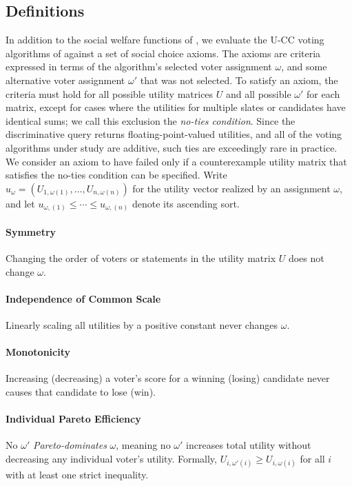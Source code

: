 \documentclass[letterpaper]{article} %
\begin{document}
\subsection{Definitions}
\label{app:axiom-definitions}

In addition to the social welfare functions of , we evaluate the \textsc{U-CC} voting algorithms of  against a set of social choice axioms.
The axioms are criteria expressed in terms of the algorithm's selected voter assignment $\omega$, and some alternative voter assignment $\omega'$ that was not selected.
To satisfy an axiom, the criteria must hold for all possible utility matrices $U$ and all possible $\omega'$ for each matrix, except for cases where the utilities for multiple slates or candidates have identical sums; we call this exclusion the \emph{no-ties condition}.
Since the discriminative query returns floating-point-valued utilities, and all of the voting algorithms under study are additive, such ties are exceedingly rare in practice.
We consider an axiom to have failed only if a counterexample utility matrix that satisfies the no-ties condition can be specified.
Write $u_\omega=(U_{1,\omega(1)},\ldots,U_{n,\omega(n)})$ for the utility vector realized by an assignment $\omega$, and let $u_{\omega,(1)}\le\cdots\le u_{\omega,(n)}$ denote its ascending sort.

\paragraph{Symmetry}
Changing the order of voters or statements in the utility matrix $U$ does not change $\omega$.

\paragraph{Independence of Common Scale}
Linearly scaling all utilities by a positive constant never changes $\omega$.

\paragraph{Monotonicity}
Increasing (decreasing) a voter's score for a winning (losing) candidate never causes that candidate to lose (win).

\paragraph{Individual Pareto Efficiency}
No $\omega'$ \emph{Pareto-dominates} $\omega$, meaning no $\omega'$ increases total utility without decreasing any individual voter's utility.
Formally, $U_{i,\omega'(i)}\ge U_{i,\omega(i)}$ for all $i$ with at least one strict inequality.
\end{document}
